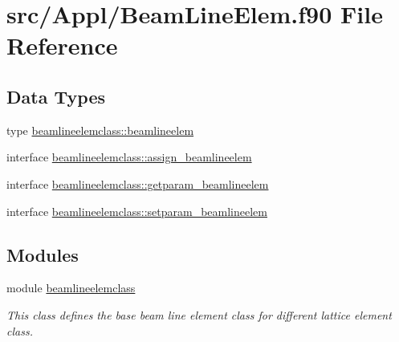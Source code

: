 \hypertarget{_beam_line_elem_8f90}{}\section{src/\+Appl/\+Beam\+Line\+Elem.f90 File Reference}
\label{_beam_line_elem_8f90}
\subsection*{Data Types}
\begin{DoxyCompactItemize}
\item 
type \mbox{\hyperlink{namespacebeamlineelemclass_structbeamlineelemclass_1_1beamlineelem}{beamlineelemclass\+::beamlineelem}}
\item 
interface \mbox{\hyperlink{interfacebeamlineelemclass_1_1assign__beamlineelem}{beamlineelemclass\+::assign\+\_\+beamlineelem}}
\item 
interface \mbox{\hyperlink{interfacebeamlineelemclass_1_1getparam__beamlineelem}{beamlineelemclass\+::getparam\+\_\+beamlineelem}}
\item 
interface \mbox{\hyperlink{interfacebeamlineelemclass_1_1setparam__beamlineelem}{beamlineelemclass\+::setparam\+\_\+beamlineelem}}
\end{DoxyCompactItemize}
\subsection*{Modules}
\begin{DoxyCompactItemize}
\item 
module \mbox{\hyperlink{namespacebeamlineelemclass}{beamlineelemclass}}
\begin{DoxyCompactList}\small\item\em This class defines the base beam line element class for different lattice element class. \end{DoxyCompactList}\end{DoxyCompactItemize}
